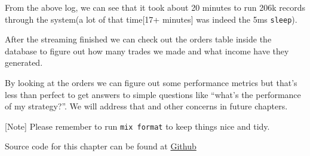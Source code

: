 \documentclass[
  oneside]{book}
\newenvironment{Shaded}{\begin{snugshade}}{\end{snugshade}}
\newcommand{\AttributeTok}[1]{\textcolor[rgb]{0.77,0.63,0.00}{#1}}
\newcommand{\ErrorTok}[1]{\textcolor[rgb]{0.64,0.00,0.00}{\textbf{#1}}}
\newcommand{\ExtensionTok}[1]{#1}
\newcommand{\KeywordTok}[1]{\textcolor[rgb]{0.13,0.29,0.53}{\textbf{#1}}}
\newcommand{\NormalTok}[1]{#1}
\newcommand{\StringTok}[1]{\textcolor[rgb]{0.31,0.60,0.02}{#1}}
\newcommand{\VariableTok}[1]{\textcolor[rgb]{0.00,0.00,0.00}{#1}}
\begin{document}
From the above log, we can see that it took about 20 minutes to run 206k records through the system(a lot of that time{[}17+ minutes{]} was indeed the 5ms \texttt{sleep}).

After the streaming finished we can check out the orders table inside the database to figure out how many trades we made and what income have they generated.

\begin{Shaded}
\end{Shaded}

By looking at the orders we can figure out some performance metrics but that's less than perfect to get answers to simple questions like ``what's the performance of my strategy?''. We will address that and other concerns in future chapters.

{[}Note{]} Please remember to run \texttt{mix\ format} to keep things nice and tidy.

Source code for this chapter can be found at \href{https://github.com/frathon/create-a-cryptocurrency-trading-bot-in-elixir-source-code/tree/chapter_15}{Github}
\end{document}
